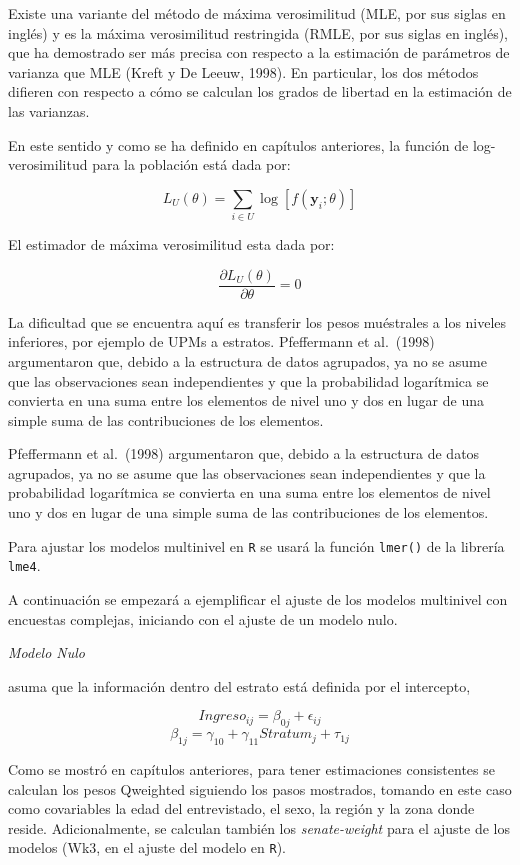 \documentclass[
  spanish,
  12pt,
]{book}
\begin{document}
Existe una variante del método de máxima verosimilitud (MLE, por sus siglas en inglés) y es la máxima verosimilitud restringida (RMLE, por sus siglas en inglés), que ha demostrado ser más precisa con respecto a la estimación de parámetros de varianza que MLE (Kreft y De Leeuw, 1998). En particular, los dos métodos difieren con respecto a cómo se calculan los grados de libertad en la estimación de las varianzas.

En este sentido y como se ha definido en capítulos anteriores, la función de log-verosimilitud para la población está dada por:

\[
L_{U}\left(\theta\right)=\sum_{i\in U}\log\left[f\left(\boldsymbol{y}_{i};\theta\right)\right]
\]

El estimador de máxima verosimilitud esta dada por:

\[
\frac{\partial L_{U}\left(\theta\right)}{\partial\theta}=0
\]

La dificultad que se encuentra aquí es transferir los pesos muéstrales a los niveles inferiores, por ejemplo de UPMs a estratos. Pfeffermann et al.~(1998) argumentaron que, debido a la estructura de datos agrupados, ya no se asume que las observaciones sean independientes y que la probabilidad logarítmica se convierta en una suma entre los elementos de nivel uno y dos en lugar de una simple suma de las contribuciones de los elementos.

Pfeffermann et al.~(1998) argumentaron que, debido a la estructura de datos agrupados, ya no se asume que las observaciones sean independientes y que la probabilidad logarítmica se convierta en una suma entre los elementos de nivel uno y dos en lugar de una simple suma de las contribuciones de los elementos.

Para ajustar los modelos multinivel en \texttt{R} se usará la función \texttt{lmer()} de la librería \texttt{lme4}.

A continuación se empezará a ejemplificar el ajuste de los modelos multinivel con encuestas complejas, iniciando con el ajuste de un modelo nulo.

\emph{Modelo Nulo}

asuma que la información dentro del estrato está definida por el intercepto,

\[
Ingreso_{ij}=\beta_{0j}+\epsilon_{ij}
\]
\[
\beta_{1j} = \gamma_{10}+\gamma_{11}Stratum_{j} + \tau_{1j}
\]

Como se mostró en capítulos anteriores, para tener estimaciones consistentes se calculan los pesos Qweighted siguiendo los pasos mostrados, tomando en este caso como covariables la edad del entrevistado, el sexo, la región y la zona donde reside. Adicionalmente, se calculan también los \emph{senate-weight} para el ajuste de los modelos (Wk3, en el ajuste del modelo en \texttt{R}).
\end{document}
